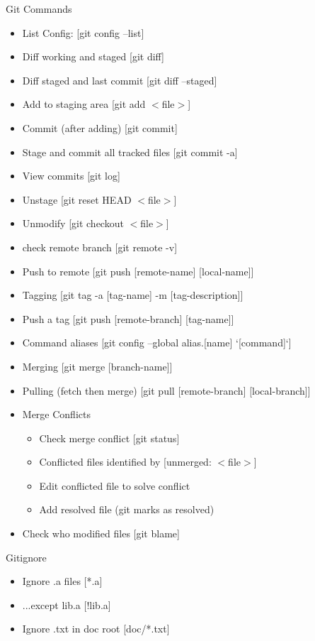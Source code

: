 \documentclass[11pt,twocolumn]{article}
\begin{document}
	Git Commands
	\begin{itemize}
		\item List Config: [git config --list]
		\item Diff working and staged [git diff]
		\item Diff staged and last commit [git diff --staged]
		\item Add to staging area [git add $<$file$>$]
		\item Commit (after adding) [git commit]
		\item Stage and commit all tracked files [git commit -a]
		\item View commits [git log]
		\item Unstage [git reset HEAD $<$file$>$]
		\item Unmodify [git checkout $<$file$>$]
		\item check remote branch [git remote -v]
		\item Push to remote [git push [remote-name] [local-name]]
		\item Tagging [git tag -a [tag-name] -m [tag-description]]
		\item Push a tag [git push [remote-branch] [tag-name]]
		\item Command aliases [git config --global alias.[name] `[command]`]
		\item Merging [git merge [branch-name]]
		\item Pulling (fetch then merge) [git pull [remote-branch] [local-branch]]
		\item Merge Conflicts
		\begin{itemize}
			\item Check merge conflict [git status]
			\item Conflicted files identified by [unmerged: $<$file$>$]
			\item Edit conflicted file to solve conflict
			\item Add resolved file (git marks as resolved)
		\end{itemize}
		\item Check who modified files [git blame]
	\end{itemize}
	Gitignore
	\begin{itemize}
		\item Ignore .a files [*.a]
		\item ...except lib.a [!lib.a]
		\item Ignore .txt in doc root [doc/*.txt]
	\end{itemize}
\end{document}
